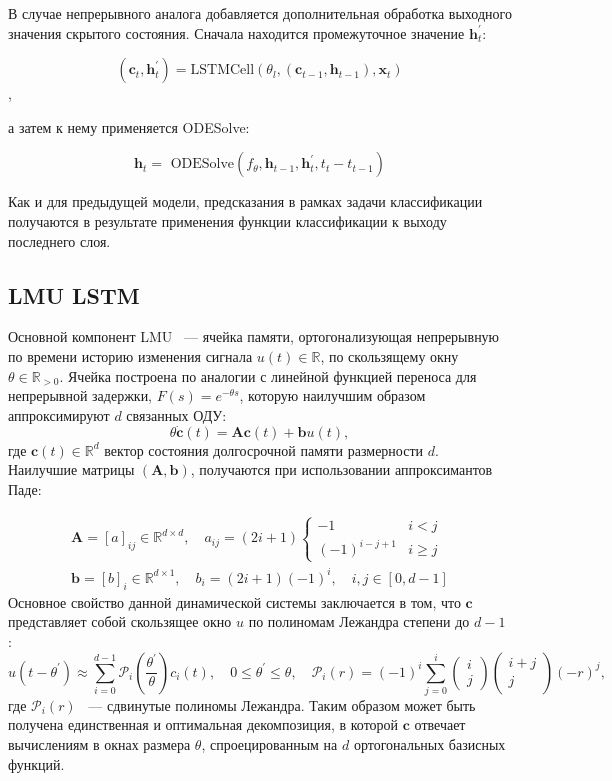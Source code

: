 \documentclass{article}
\newcommand{\x}{\mathbf{x}}
\newcommand{\cc}{\mathbf{c}}
\newcommand{\h}{\mathbf{h}}
\begin{document}
В случае непрерывного аналога добавляется дополнительная обработка выходного значения скрытого состояния. Сначала находится промежуточное значение $\h_t^{\prime}$:

$$(\cc_t, \h_t^{\prime}) = \text{LSTMCell}\left(\theta_{l},\left(\cc_{t-1}, \mathbf{h}_{t-1}\right), \x_{t}\right)$$,

а затем к нему применяется ODESolve:

$$\mathbf{h}_{t}=\text { ODESolve}\left(f_{\theta}, \mathbf{h}_{t-1}, \mathbf{h}_{t}^{\prime}, t_{t}-t_{t-1}\right)$$

Как и для предыдущей модели, предсказания в рамках задачи классификации получаются в результате применения функции классификации к выходу последнего слоя.

\subsection{LMU LSTM}

Основной компонент LMU ~--- ячейка памяти, ортогонализующая непрерывную по времени историю изменения сигнала  $u(t) \in \mathbb{R}$, по скользящему окну $\theta \in \mathbb{R}_{>0}$. Ячейка построена по аналогии с линейной функцией переноса для непрерывной задержки, $F(s)=e^{-\theta s}$, которую наилучшим образом аппроксимируют $d$ связанных ОДУ:
$$
\theta \dot{\mathbf{c}}(t)=\mathbf{A} \mathbf{c}(t)+\mathbf{b} u(t),
$$
где $\mathbf{c}(t) \in \mathbb{R}^{d}$ вектор состояния долгосрочной памяти размерности $d$. Наилучшие матрицы $(\mathbf{A}, \mathbf{b})$, получаются при использовании аппроксимантов Паде:

$$
\begin{array}{c}
\mathbf{A}=[a]_{i j} \in \mathbb{R}^{d \times d}, \quad a_{i j}=(2 i+1)\left\{\begin{array}{ll}
-1 & i<j \\
(-1)^{i-j+1} & i \geq j
\end{array}\right. \\
\mathbf{b}=[b]_{i} \in \mathbb{R}^{d \times 1}, \quad b_{i}=(2 i+1)(-1)^{i}, \quad i, j \in[0, d-1]
\end{array}
$$
Основное свойство данной динамической системы заключается в том, что $\mathbf{c}$ представляет собой скользящее окно $u$ по полиномам Лежандра степени до $d-1$ :
$$
u\left(t-\theta^{\prime}\right) \approx \sum_{i=0}^{d-1} \mathcal{P}_{i}\left(\frac{\theta^{\prime}}{\theta}\right) c_{i}(t), \quad 0 \leq \theta^{\prime} \leq \theta, \quad \mathcal{P}_{i}(r)=(-1)^{i} \sum_{j=0}^{i}\left(\begin{array}{c}
i \\
j
\end{array}\right)\left(\begin{array}{c}
i+j \\
j
\end{array}\right)(-r)^{j},
$$
где  $\mathcal{P}_{i}(r)$  ~--- сдвинутые полиномы Лежандра. Таким образом может быть получена единственная и оптимальная декомпозиция, в которой $\mathbf{c}$ отвечает вычислениям в окнах размера $\theta$, спроецированным на $d$ ортогональных базисных функций.
\end{document}
